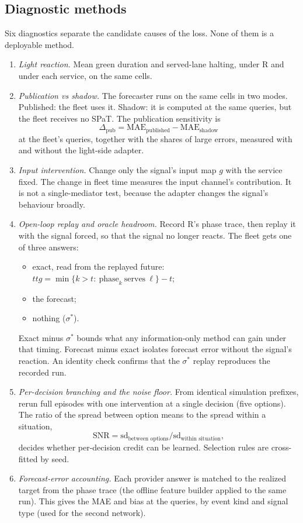 \documentclass[11pt]{article}
\begin{document}
\subsection{Diagnostic methods}\label{sec:diagmethods}
Six diagnostics separate the candidate causes of the loss. None of them is a deployable method.
\begin{enumerate}\setlength\itemsep{1pt}
\item \emph{Light reaction.} Mean green duration and served-lane halting, under R and under each service, on the same cells.
\item \emph{Publication vs shadow.} The forecaster runs on the same cells in two modes. Published: the fleet uses it. Shadow: it is
computed at the same queries, but the fleet receives no SPaT. The publication sensitivity is
\begin{equation}
\Delta_{\mathrm{pub}}=\mathrm{MAE}_{\mathrm{published}}-\mathrm{MAE}_{\mathrm{shadow}}
\end{equation}
at the fleet's queries, together with the shares of large errors, measured with and without the light-side adapter.
\item \emph{Input intervention.} Change only the signal's input map $g$ with the service fixed. The change in fleet time measures the
input channel's contribution. It is not a single-mediator test, because the adapter changes the signal's behaviour broadly.
\item \emph{Open-loop replay and oracle headroom.} Record R's phase trace, then replay it with the signal forced, so that the signal no
longer reacts. The fleet gets one of three answers:
\begin{itemize}\setlength\itemsep{0pt}
\item exact, read from the replayed future: $\mathit{ttg}=\min\{k>t:\ \text{phase}_k\ \text{serves}\ \ell\}-t$;
\item the forecast;
\item nothing ($\sigma^*$).
\end{itemize}
Exact minus $\sigma^*$ bounds what any information-only method can gain under that timing. Forecast minus exact isolates forecast error
without the signal's reaction. An identity check confirms that the $\sigma^*$ replay reproduces the recorded run.
\item \emph{Per-decision branching and the noise floor.} From identical simulation prefixes, rerun full episodes with one intervention at
a single decision (five options). The ratio of the spread between option means to the spread within a situation,
\begin{equation}
\mathrm{SNR}=\mathrm{sd}_{\text{between options}}/\mathrm{sd}_{\text{within situation}},
\end{equation}
decides whether per-decision credit can be learned. Selection rules are cross-fitted by seed.
\item \emph{Forecast-error accounting.} Each provider answer is matched to the realized target from the phase trace (the offline
feature builder applied to the same run). This gives the MAE and bias at the queries, by event kind and signal type (used for the second
network).
\end{enumerate}
\end{document}
